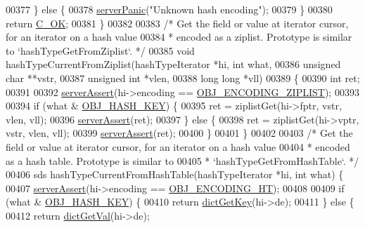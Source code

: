 \begin{DoxyCode}
00377     \} \textcolor{keywordflow}{else} \{
00378         \hyperlink{server_8h_a11cc378e7778a830b41240578de3b204}{serverPanic}(\textcolor{stringliteral}{"Unknown hash encoding"});
00379     \}
00380     \textcolor{keywordflow}{return} \hyperlink{server_8h_a303769ef1065076e68731584e758d3e1}{C\_OK};
00381 \}
00382 
00383 \textcolor{comment}{/* Get the field or value at iterator cursor, for an iterator on a hash value}
00384 \textcolor{comment}{ * encoded as a ziplist. Prototype is similar to `hashTypeGetFromZiplist`. */}
00385 \textcolor{keywordtype}{void} hashTypeCurrentFromZiplist(hashTypeIterator *hi, \textcolor{keywordtype}{int} what,
00386                                 \textcolor{keywordtype}{unsigned} \textcolor{keywordtype}{char} **vstr,
00387                                 \textcolor{keywordtype}{unsigned} \textcolor{keywordtype}{int} *vlen,
00388                                 \textcolor{keywordtype}{long} \textcolor{keywordtype}{long} *vll)
00389 \{
00390     \textcolor{keywordtype}{int} ret;
00391 
00392     \hyperlink{server_8h_a88114b5169b4c382df6b56506285e56a}{serverAssert}(hi->encoding == \hyperlink{server_8h_aabf064ede983103f1fd0df2086e84eee}{OBJ\_ENCODING\_ZIPLIST});
00393 
00394     \textcolor{keywordflow}{if} (what & \hyperlink{server_8h_aede46b2a96d6f19aff38ccdac76598ac}{OBJ\_HASH\_KEY}) \{
00395         ret = ziplistGet(hi->fptr, vstr, vlen, vll);
00396         \hyperlink{server_8h_a88114b5169b4c382df6b56506285e56a}{serverAssert}(ret);
00397     \} \textcolor{keywordflow}{else} \{
00398         ret = ziplistGet(hi->vptr, vstr, vlen, vll);
00399         \hyperlink{server_8h_a88114b5169b4c382df6b56506285e56a}{serverAssert}(ret);
00400     \}
00401 \}
00402 
00403 \textcolor{comment}{/* Get the field or value at iterator cursor, for an iterator on a hash value}
00404 \textcolor{comment}{ * encoded as a hash table. Prototype is similar to}
00405 \textcolor{comment}{ * `hashTypeGetFromHashTable`. */}
00406 sds hashTypeCurrentFromHashTable(hashTypeIterator *hi, \textcolor{keywordtype}{int} what) \{
00407     \hyperlink{server_8h_a88114b5169b4c382df6b56506285e56a}{serverAssert}(hi->encoding == \hyperlink{server_8h_a9c10219f68afc557d510d108257d238b}{OBJ\_ENCODING\_HT});
00408 
00409     \textcolor{keywordflow}{if} (what & \hyperlink{server_8h_aede46b2a96d6f19aff38ccdac76598ac}{OBJ\_HASH\_KEY}) \{
00410         \textcolor{keywordflow}{return} \hyperlink{dict_8h_a3271c334309904a3086deca94f96e46e}{dictGetKey}(hi->de);
00411     \} \textcolor{keywordflow}{else} \{
00412         \textcolor{keywordflow}{return} \hyperlink{dict_8h_ae8d2cc391873b2bea2b87c4f80f43120}{dictGetVal}(hi->de);

\end{DoxyCode}
